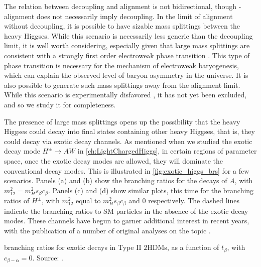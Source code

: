 The relation between decoupling and alignment is not bidirectional, though - alignment does not necessarily imply decoupling. In the limit of alignment without decoupling, it is possible to have sizable mass splittings between the heavy Higgses. While this scenario is necessarily less generic than the decoupling limit, it is well worth considering, especially given that large mass splittings are consistent with a strongly first order electroweak phase transition \cite{Dorsch:2014qja}. This type of phase transition is necessary for the mechanism of electroweak baryogenesis, which can explain the observed level of baryon asymmetry in the universe. It is also possible to generate such mass splittings away from the alignment limit. While this scenario is experimentally disfavored \cite{Aad:2015pla}, it has not yet been excluded, and so we study it for completeness.

The presence of large mass splittings opens up the possibility that the heavy Higgses could decay into final states containing other heavy Higgses, that is, they could decay via exotic decay channels. As mentioned when we studied the exotic decay mode $H^\pm \rightarrow AW$ in \autoref{ch:LightChargedHiggs}, in certain regions of parameter space, once the exotic decay modes are allowed, they will dominate the conventional decay modes. This is illustrated in \autoref{fig:exotic_higgs_brs} for a few scenarios. Panels (a) and (b) show the branching ratios for the decays of \emph{A}, with $m_{12}^2 = m_H^2 s_\beta c_\beta$. Panels (c) and (d) show similar plots, this time for the branching ratios of $H^\pm$, with $m_{12}^2$ equal to $m_H^2 s_\beta c_\beta$ and $0$ respectively. The dashed lines indicate the branching ratios to SM particles in the absence of the exotic decay modes. These channels have begun to garner additional interest in recent years, with the publication of a number of original analyses on the topic \cite{Dorsch:2014qja,Dorsch:2016tab,Coleppa2013a,Coleppa2014a,Brownson:2013lka,Coleppa:2014cca,Kling:2015uba,Li:2015lra,Maitra:2014qea,Basso:2012st,Dermisek:2013cxa,Mohn:2005lda,Assamagan:2000ud}. 

\begin{marginfigure}[1cm]
  \centering
  \caption{branching ratios for exotic decays in Type II $2$HDMs, as a function of $t_\beta$, with $c_{\beta-\alpha} = 0$. Source: \cite{Kling:2016opi}.}
\label{fig:exotic_higgs_brs}
\end{marginfigure}

